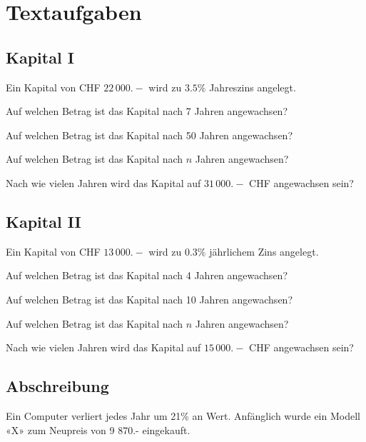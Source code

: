 \section{Textaufgaben}
\subsection{Kapital I}
Ein Kapital von CHF $22\,000.-$ wird zu $3.5\%$ Jahreszins angelegt.
\begin{bbwAufgabenBlock}
\item Auf welchen Betrag ist das Kapital nach 7 Jahren
angewachsen? \plz{}
\item Auf welchen Betrag ist das Kapital nach 50 Jahren
angewachsen?  \plz{}
\item Auf welchen Betrag ist das Kapital nach $n$ Jahren
angewachsen?  \plz{} \noTRAINER{\newpage}
\item Nach wie vielen Jahren wird das Kapital auf $31\,000.-$ CHF
angewachsen sein?  \plz{}
\end{bbwAufgabenBlock}
\platzFuerBerechnungenBisEndeSeite{}
\subsection{Kapital II}
Ein Kapital von CHF $13\,000.-$ wird zu $0.3\%$ jährlichem Zins angelegt.
\begin{bbwAufgabenBlock}
\item Auf welchen Betrag ist das Kapital nach 4 Jahren
angewachsen?  \plz{}
\item Auf welchen Betrag ist das Kapital nach 10 Jahren
angewachsen?  \plz{}
\item Auf welchen Betrag ist das Kapital nach $n$ Jahren
angewachsen?  \plz{} \noTRAINER{\newpage}
\item Nach wie vielen Jahren wird das Kapital auf $15\,000.-$ CHF
angewachsen sein?  \plz{}
\end{bbwAufgabenBlock}
\platzFuerBerechnungenBisEndeSeite{}
\subsection{Abschreibung}
Ein Computer verliert jedes Jahr um 21\% an Wert. Anfänglich wurde ein Modell «X»
zum Neupreis von 9 870.- eingekauft.

